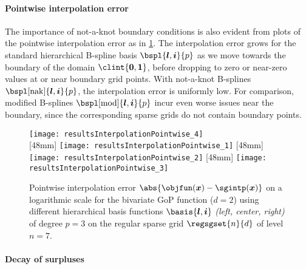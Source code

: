 \vspace*{-0.5em}

\paragraph{Pointwise interpolation error}

The importance of not-a-knot boundary conditions is also evident
from plots of the pointwise interpolation error as in
\cref{fig:resultsInterpolationErrorPointwise}.
The interpolation error grows for the standard hierarchical
B-spline basis $\bspl{\*l,\*i}{p}$
as we move towards the boundary of the domain $\clint{\*0, \*1}$,
before dropping to zero or near-zero values at or near boundary grid points.
With not-a-knot B-splines $\bspl[\nak]{\*l,\*i}{p}$,
the interpolation error is uniformly low.
For comparison, modified B-splines $\bspl[\modified]{\*l,\*i}{p}$
incur even worse issues near the boundary, since the corresponding sparse grids
do not contain boundary points.

\begin{figure}
  \texttt{[image: resultsInterpolationPointwise\_4]}\\[2mm]%
  [48mm]{%
    \texttt{[image: resultsInterpolationPointwise\_1]}%
  }%
  \hfill%
  [48mm]{%
    \texttt{[image: resultsInterpolationPointwise\_2]}%
  }%
  \hfill%
  [48mm]{%
    \texttt{[image: resultsInterpolationPointwise\_3]}%
  }%
  \caption[Pointwise interpolation error for the GoP function]{%
    Pointwise interpolation error
    $\abs{\objfun(\*x) - \sgintp(\*x)}$ on a logarithmic scale
    for the bivariate GoP function ($d = 2$)
    using different hierarchical basis functions
    $\basis{\*l,\*i}$ \emph{(left, center, right)} of degree $p = 3$ on
    the regular sparse grid $\regsgset{n}{d}$ of level $n = 7$.%
  }%
  \label{fig:resultsInterpolationErrorPointwise}%
\end{figure}

\vspace*{-0.3em}

\paragraph{Decay of surpluses}

